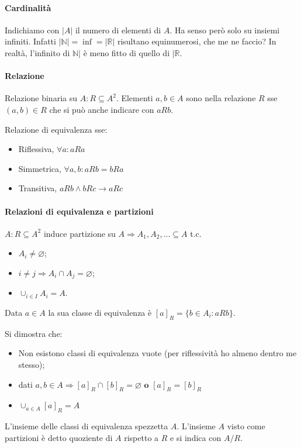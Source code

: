 \documentclass{article}
\begin{document}
\paragraph{Cardinalità}
Indichiamo con $|A|$ il numero di elementi di $A$. Ha senso però solo su insiemi infiniti. Infatti $|\mathbb{N}| = \inf = |\mathbb{R}|$ risultano equinumerosi, che me ne faccio? In realtà, l'infinito di $\mathbb{N}|$ è meno fitto di quello di $|\mathbb{R}$.
\paragraph{Relazione}
Relazione binaria su $A:R \subseteq A^2$. Elementi $a,b \in A$ sono nella relazione $R$ sse $(a,b) \in R$ che si può anche indicare con $aRb$.

\noindent
Relazione di equivalenza sse:
\begin{itemize}
    \item Riflessiva, $\forall a: aRa$
    \item Simmetrica, $\forall a,b: aRb=bRa$
    \item Transitiva, $aRb \wedge bRc \rightarrow aRc$
\end{itemize}
\paragraph{Relazioni di equivalenza e partizioni}
$A:R \subseteq A^2$ induce partizione su $A \Rightarrow A_1, A_2, \dots \subseteq A$ t.c.
\begin{itemize}
    \item $A_i \neq \varnothing$;
    \item $i \neq j \Rightarrow A_i \cap A_j = \varnothing$;
    \item $\cup_{i \in I} A_i = A$.
\end{itemize}
Data $a \in A$ la sua classe di equivalenza è $[a]_R=\{b \in A_i: aRb\}$.


\noindent
Si dimostra che:
\begin{itemize}
    \item Non esistono classi di equivalenza vuote (per riflessività ho almeno dentro me stesso);
    \item dati $a,b \in A \Rightarrow [a]_R \cap [b]_R = \varnothing \textbf{ o } [a]_R = [b]_R$
    \item $\cup_{a \in A}[a]_R = A$
\end{itemize}

L'insieme delle classi di equivalenza spezzetta $A$. L'insieme $A$ visto come partizioni è detto quoziente di $A$ rispetto a $R$ e si indica con $A/R$.
\end{document}
